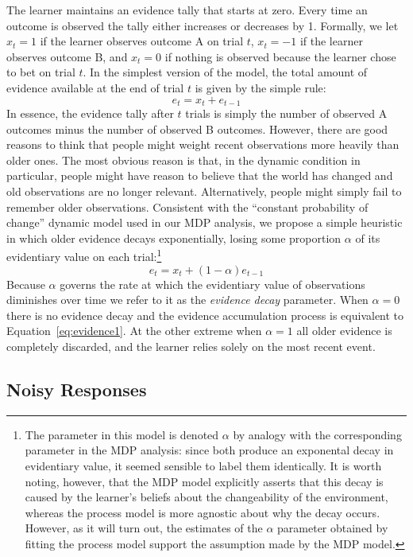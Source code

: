\documentclass[authoryear]{elsarticle}
\newcommand{\subsectionX}[1]{\subsection{#1}}
\begin{document}
The learner maintains an evidence tally that starts at zero. Every time an outcome is observed the tally either increases or decreases by 1. Formally, we let $x_t = 1$ if the learner observes outcome A on trial $t$, $x_t = -1$ if the learner observes outcome B, and $x_t = 0$ if nothing is observed because the learner chose to bet on trial $t$. In the simplest version of the model, the total amount of evidence available at the end of trial $t$ is given by the simple rule:
\begin{equation}
e_t = x_t + e_{t-1}
\label{eq:evidence1}
\end{equation}
In essence, the evidence tally after $t$ trials is simply the number of observed A outcomes minus the number of observed B outcomes. However, there are good reasons to think that people might weight  recent observations more heavily than older ones. The most obvious reason is that, in the dynamic condition in particular, people might have reason to believe that the world has changed and old observations are no longer relevant. Alternatively, people might simply fail to remember older observations. Consistent with the ``constant probability of change'' dynamic model used in our MDP analysis, we propose a simple heuristic in which older evidence decays exponentially, losing some proportion $\alpha$ of its evidentiary value on each trial:\footnote{The parameter in this model is denoted $\alpha$ by analogy with the corresponding parameter in the MDP analysis: since both produce an exponental decay in evidentiary value, it seemed sensible to label them identically. It is worth noting, however, that the MDP model explicitly asserts that this decay is caused by the learner's beliefs about the changeability of the environment, whereas the process model is more agnostic about why the decay occurs. However, as it will turn out, the estimates of the $\alpha$ parameter obtained by fitting the process model support the assumption made by the MDP model.}
\begin{equation}
e_t = x_t + (1-\alpha) e_{t-1}
\end{equation}
Because $\alpha$ governs the rate at which the evidentiary value of observations diminishes over time we refer to it as the {\it evidence decay} parameter. When $\alpha=0$ there is no evidence decay and the evidence accumulation process is equivalent to Equation~\ref{eq:evidence1}. At the other extreme when $\alpha=1$ all older evidence is completely discarded, and the learner relies solely on the most recent event.

\subsectionX{Noisy Responses}
\end{document}

